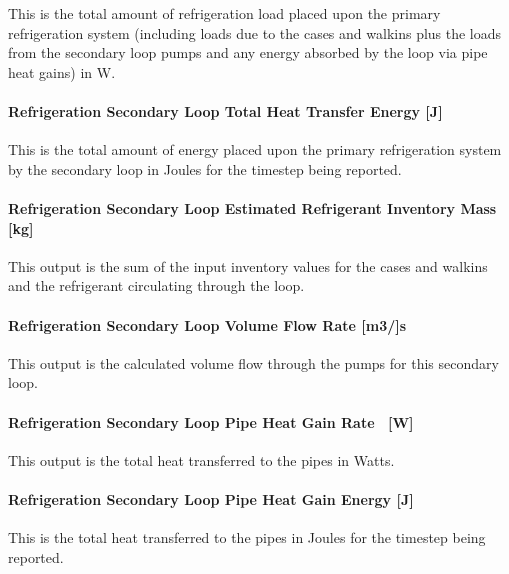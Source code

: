 This is the total amount of refrigeration load placed upon the primary refrigeration system (including loads due to the cases and walkins plus the loads from the secondary loop pumps and any energy absorbed by the loop via pipe heat gains) in W.

\paragraph{Refrigeration Secondary Loop Total Heat Transfer Energy {[}J{]}}\label{refrigeration-secondary-loop-total-heat-transfer-energy-j}

This is the total amount of energy placed upon the primary refrigeration system by the secondary loop in Joules for the timestep being reported.

\paragraph{Refrigeration Secondary Loop Estimated Refrigerant Inventory Mass {[}kg{]}}\label{refrigeration-secondary-loop-estimated-refrigerant-inventory-mass-kg}

This output is the sum of the input inventory values for the cases and walkins and the refrigerant circulating through the loop.

\paragraph{Refrigeration Secondary Loop Volume Flow Rate {[}m3/{]}s}\label{refrigeration-secondary-loop-volume-flow-rate-m3s}

This output is the calculated volume flow through the pumps for this secondary loop.

\paragraph{Refrigeration Secondary Loop Pipe Heat Gain Rate~ {[}W{]}}\label{refrigeration-secondary-loop-pipe-heat-gain-rate-w}

This output is the total heat transferred to the pipes in Watts.

\paragraph{Refrigeration Secondary Loop Pipe Heat Gain Energy {[}J{]}}\label{refrigeration-secondary-loop-pipe-heat-gain-energy-j}

This is the total heat transferred to the pipes in Joules for the timestep being reported.

